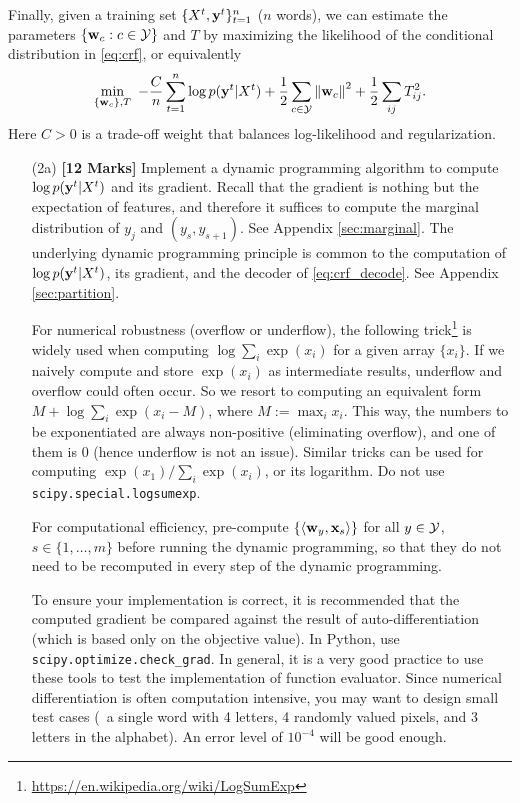 \documentclass[11pt]{report}
\begin{document}
	Finally, given a training set $\{X^t, \mathbf{\boldsymbol{y}}^t\}_{t=1}^n$ ($n$ words),
	we can estimate the parameters $\{\mathbf{\boldsymbol{w}}_c : c \in \mathcal{Y}\}$ and $T$ by maximizing the likelihood of the conditional distribution in \eqref{eq:crf}, or equivalently
	\begin{align}
		\label{eq:obj_MLE}
		\min_{\{\mathbf{\boldsymbol{w}}_c\}, T} \ -\frac{C}{n}\sum_{t=1}^n \log p(\mathbf{\boldsymbol{y}}^t | X^t) 
		+ \frac{1}{2} \sum_{c \in \mathcal{Y}} \left\|\mathbf{\boldsymbol{w}}_c\right\|^2 
		+ \frac{1}{2} \sum_{ij} T^2_{ij}.
	\end{align}
	Here $C > 0$ is a trade-off weight that balances log-likelihood and regularization.
	
	
	\begin{itemize}
		\item[(2a)] {\bf [12 Marks]} Implement a dynamic programming algorithm to compute $\log p(\mathbf{\boldsymbol{y}}^t | X^t)$ and its gradient.  Recall that the gradient is nothing but the expectation of features, and therefore it suffices to compute the marginal distribution of $y_j$ and $(y_s, y_{s+1})$. See Appendix \ref{sec:marginal}.
		The underlying dynamic programming principle is common to the computation of $\log p(\mathbf{\boldsymbol{y}}^t | X^t)$, its gradient, and the decoder of \eqref{eq:crf_decode}.
		See Appendix \ref{sec:partition}.
		
		For numerical robustness (overflow or underflow), the following trick\footnote{\href{https://en.wikipedia.org/wiki/LogSumExp}{\url{https://en.wikipedia.org/wiki/LogSumExp}}} is widely used when computing $\log \sum_i \exp(x_i)$ for a given array $\{x_i\}$.  If we naively compute and store $\exp(x_i)$ as intermediate results, underflow and overflow could often occur.  So we resort to computing an equivalent form $M + \log \sum_i \exp(x_i - M)$, where $M := \max_i x_i$.  This way, the numbers to be exponentiated are always non-positive (eliminating overflow), and one of them is 0 (hence underflow is not an issue).  Similar tricks can be used for computing $\exp(x_1) / \sum_i \exp(x_i)$, or its logarithm.
		Do not use \verb#scipy.special.logsumexp#.
		
		For computational efficiency, pre-compute $\{\left\langle \mathbf{\boldsymbol{w}}_y,\mathbf{\boldsymbol{x}}_s \right\rangle\}$ for all $y \in \mathcal{Y}$, $s \in \{1, \ldots, m\}$ before running the dynamic programming,
		so that they do not need to be recomputed in every step of the dynamic programming.
		
		To ensure your implementation is correct, it is recommended that the computed gradient be compared against the result of auto-differentiation (which is based only on the objective value).
		In Python, use \verb#scipy.optimize.check_grad#.	
		In general, it is a very good practice to use these tools to test the implementation of function evaluator.
		Since numerical differentiation is often computation intensive, you may want to design small test cases (\eg\ a single word with 4 letters, 4 randomly valued pixels, and 3 letters in the alphabet).
		An error level of $10^{-4}$ will be good enough.
		

\end{itemize}
\end{document}
